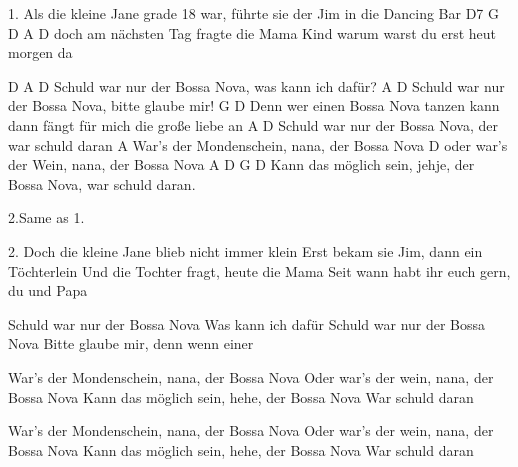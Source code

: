 1. Als die kleine Jane grade 18 war, führte sie der Jim in die Dancing Bar
                 D7               G        D             A                 D
doch am nächsten Tag fragte die Mama Kind warum warst du erst heut morgen da
 
   D                      A                    D
Schuld war nur der Bossa Nova, was kann ich dafür?
                          A                  D
Schuld war nur der Bossa Nova, bitte glaube mir!
                      G                                        D
Denn wer einen Bossa Nova tanzen kann dann fängt für mich die große liebe an
                          A                      D
Schuld war nur der Bossa Nova, der war schuld daran
                   A
War's der Mondenschein, nana, der Bossa Nova
                D
oder war's der Wein, nana, der Bossa Nova
                  A                            D     G      D
Kann das möglich sein, jehje, der Bossa Nova, war schuld daran.


2.Same as 1.

2. Doch die kleine Jane blieb nicht immer klein
Erst bekam sie Jim, dann ein Töchterlein
Und die Tochter fragt, heute die Mama
Seit wann habt ihr euch gern, du und Papa

Schuld war nur der Bossa Nova
Was kann ich dafür
Schuld war nur der Bossa Nova
Bitte glaube mir, denn wenn einer

War's der Mondenschein, nana, der Bossa Nova
Oder war's der wein, nana, der Bossa Nova
Kann das möglich sein, hehe, der Bossa Nova
War schuld daran

War's der Mondenschein, nana, der Bossa Nova
Oder war's der wein, nana, der Bossa Nova
Kann das möglich sein, hehe, der Bossa Nova
War schuld daran 

